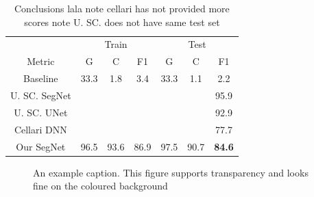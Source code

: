 \documentclass[
]{dtuposter}
\begin{document}
\begin{dtupostercontent}
\begin{table}
\begin{tabular}{c|ccc|ccc|}
		\rule[-1ex]{0pt}{2.5ex}  & \multicolumn{3}{c|}{Train} &  \multicolumn{3}{c|}{Test} \\ 
		
		\rule[-1ex]{0pt}{2.5ex} Metric  & G & C & F1 & G & C & F1 \\ 
		\hline
		\rule[-1ex]{0pt}{2.5ex} Baseline&  33.3 &1.8  &3.4  &33.3  &1.1  &2.2  \\ 
		
		\rule[-1ex]{0pt}{2.5ex} U. SC. SegNet    &  &  &  &  &  &95.9  \\ 
		\rule[-1ex]{0pt}{2.5ex} U. SC. UNet   &  &  &  &  &  &92.9  \\ 
		\rule[-1ex]{0pt}{2.5ex} Cellari DNN   &  &  &  &  &  &77.7  \\ 
		\hline 
		\rule[-1ex]{0pt}{2.5ex} Our SegNet & 96.5&93.6  & 86.9 &97.5  & 90.7  &\textbf{84.6}  \\ 
	\end{tabular} 
\caption{Conclusions lala note cellari has not provided more scores note U. SC. does not have same test set}
\end{table}




\begin{figure}
	\centering
{}
\caption{An example caption. This figure supports transparency and looks fine on 
the coloured background}\label{fig:example}
\end{figure}



\end{dtupostercontent}
\end{document}
